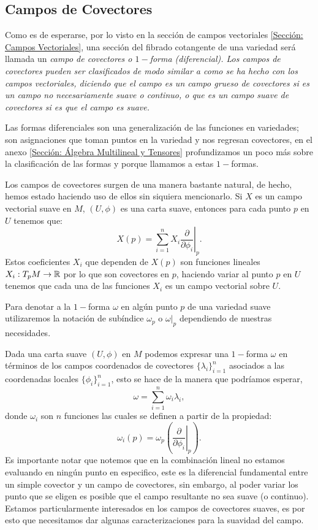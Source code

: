 \subsection{Campos de Covectores}\label{Subsección: Campos de Covectores}
Como es de esperarse, por lo visto en la sección de campos vectoriales \ref{Sección: Campos Vectoriales}, una sección del fibrado cotangente de una variedad será llamada un \it{campo de covectores} o \it{$1-$forma (diferencial)}. Los campos de covectores pueden ser clasificados de modo similar a como se ha hecho con los campos vectoriales, diciendo que el campo es un \it{campo grueso de covectores} si es un campo no necesariamente suave o continuo, o que es un \it{campo suave de covectores} si es que el campo es suave.

Las formas diferenciales son una generalización de las funciones en variedades; son asignaciones que toman puntos en la variedad y nos regresan covectores, en el anexo \ref{Sección: Álgebra Multilineal y Tensores} profundizamos un poco más sobre la clasificación de las formas y porque llamamos a estas $1-$formas.

Los campos de covectores surgen de una manera bastante natural, de hecho, hemos estado haciendo uso de ellos sin siquiera mencionarlo. Si $X$ es un campo vectorial suave en $M$, $(U, \phi)$ es una carta suave, entonces para cada punto $p$ en $U$ tenemos que:
\[
	X(p) = \sum_{i=1}^{n} X_i \left. \frac{\partial}{\partial \phi_i} \right|_{p}.
\]
Estos coeficientes $X_i$ que dependen de $X(p)$ son funciones lineales $X_i: T_{p}M \to \mathbb{R}$ por lo que son covectores en $p$, haciendo variar al punto $p$ en $U$ tenemos que cada una de las funciones $X_i$ es un campo vectorial sobre $U$.

Para denotar a la $1-$forma $\omega$ en algún punto $p$ de una variedad suave utilizaremos la notación de subíndice $\omega_p$ o $\omega|_{p}$ dependiendo de nuestras necesidades.

Dada una carta suave $(U,\phi)$ en $M$ podemos expresar una $1-$forma $\omega$ en términos de los campos coordenados de covectores $\{\lambda_i\}_{i=1}^n$ asociados a las coordenadas locales $\{\phi_i\}_{i=1}^n$, esto se hace de la manera que podríamos esperar,
\[
	\omega = \sum_{i=1}^{n} \omega_i \lambda_i,
\]
donde $\omega_i$ son $n$ funciones las cuales se definen a partir de la propiedad:
\[
	\omega_i(p)
	=
	\omega_p \left(\left.
	\frac{\partial}{\partial \phi_i}
	\right|_{p}\right).
\]
Es importante notar que notemos que en la combinación lineal no estamos evaluando en ningún punto en especifico, este es la diferencial fundamental entre un simple covector y un campo de covectores, sin embargo, al poder variar los punto que se eligen es posible que el campo resultante no sea suave (o continuo). Estamos particularmente interesados en los campos de covectores suaves, es por esto que necesitamos dar algunas caracterizaciones para la suavidad del campo.

